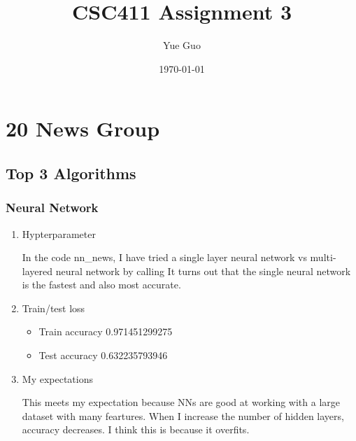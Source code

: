\documentclass[letterpaper, 12]{article}
\date{\today}
\title{CSC411 Assignment 3}
\author{Yue Guo}
\begin{document}
\maketitle

\section{20 News Group}
\subsection{Top 3 Algorithms}
\subsubsection{Neural Network}
\begin{enumerate}

    \item Hypterparameter
	
	In the code nn\_news, I have tried a single layer neural network vs multi-layered neural network by calling  It turns out that the single neural network is the fastest and also most accurate.

	\item Train/test loss
	\begin{itemize}
     \item  Train accuracy 0.971451299275
     \item Test accuracy 0.632235793946
        \end{itemize}
      \item My expectations
      
      This meets my expectation because NNs are good at working with a large dataset with many feartures. When I increase the number of hidden layers, accuracy decreases. I think this is because it overfits.
  
\end{enumerate}
\end{document}
